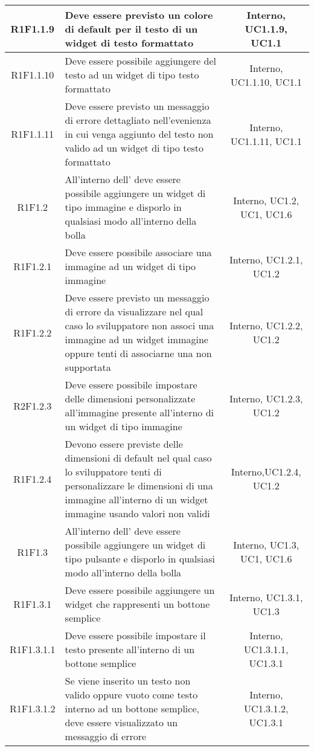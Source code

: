 \begin{longtable}{|c|>{\centering}m{7cm}|c|}
			\hline
			R1F1.1.9 & Deve essere previsto un colore di default per il testo di un widget di testo formattato & Interno, UC1.1.9, UC1.1 \\
			\hline
			R1F1.1.10 & Deve essere possibile aggiungere del testo ad un widget di tipo testo formattato & Interno, UC1.1.10, UC1.1 \\
			\hline
			R1F1.1.11 & Deve essere previsto un messaggio di errore dettagliato nell'evenienza in cui venga aggiunto del testo non valido ad un widget di tipo testo formattato & Interno, UC1.1.11, UC1.1 \\
			\hline
			R1F1.2 & All'interno dell'\termine{SDK} deve essere possibile aggiungere un widget di tipo immagine e disporlo in qualsiasi modo all'interno della bolla & Interno, UC1.2, UC1, UC1.6 \\ 
			\hline
			R1F1.2.1 & Deve essere possibile associare una immagine ad un widget di tipo immagine & Interno, UC1.2.1, UC1.2 \\
		\hline
		R1F1.2.2 & Deve essere previsto un messaggio di errore da visualizzare nel qual caso lo sviluppatore non associ una immagine ad un widget immagine oppure tenti di associarne una non supportata & Interno, UC1.2.2, UC1.2 \\
		\hline
		R2F1.2.3 & Deve essere possibile impostare delle dimensioni personalizzate all'immagine presente all'interno di un widget di tipo immagine & Interno, UC1.2.3, UC1.2 \\
		\hline
		R1F1.2.4 & Devono essere previste delle dimensioni di default nel qual caso lo sviluppatore tenti di personalizzare le dimensioni di una immagine all'interno di un widget immagine usando valori non validi & Interno,UC1.2.4, UC1.2 \\
			\hline
			R1F1.3 & All'interno dell'\termine{SDK} deve essere possibile aggiungere un widget di tipo pulsante e disporlo in qualsiasi modo all'interno della bolla & Interno, UC1.3, UC1, UC1.6 \\ 
			\hline
			R1F1.3.1 & Deve essere possibile aggiungere un widget che rappresenti un bottone semplice & Interno, UC1.3.1, UC1.3 \\
			\hline
			R1F1.3.1.1 & Deve essere possibile impostare il testo presente all'interno di un bottone semplice & Interno, UC1.3.1.1, UC1.3.1 \\
			\hline
			R1F1.3.1.2 & Se viene inserito un testo non valido oppure vuoto come testo interno ad un bottone semplice, deve essere visualizzato un messaggio di errore & Interno, UC1.3.1.2, UC1.3.1 \\

\end{longtable}
